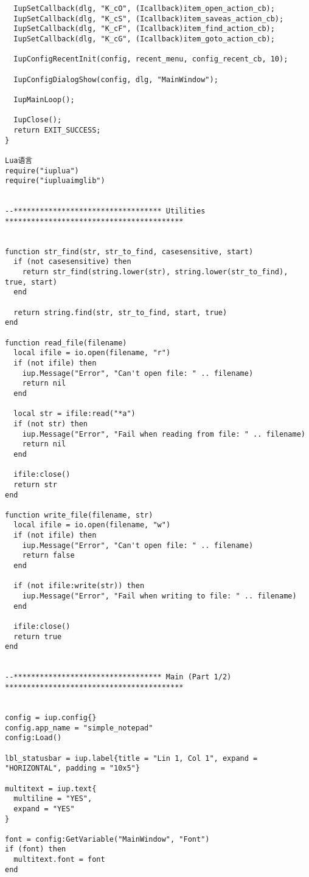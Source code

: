 \documentclass{ctexart}
\begin{document}
\begin{lstlisting}
  IupSetCallback(dlg, "K_cO", (Icallback)item_open_action_cb);
  IupSetCallback(dlg, "K_cS", (Icallback)item_saveas_action_cb);
  IupSetCallback(dlg, "K_cF", (Icallback)item_find_action_cb);
  IupSetCallback(dlg, "K_cG", (Icallback)item_goto_action_cb);

  IupConfigRecentInit(config, recent_menu, config_recent_cb, 10);

  IupConfigDialogShow(config, dlg, "MainWindow");

  IupMainLoop();

  IupClose();
  return EXIT_SUCCESS;
}

Lua语言
require("iuplua")
require("iupluaimglib")


--********************************** Utilities *****************************************


function str_find(str, str_to_find, casesensitive, start)
  if (not casesensitive) then
    return str_find(string.lower(str), string.lower(str_to_find), true, start)
  end

  return string.find(str, str_to_find, start, true)
end

function read_file(filename)
  local ifile = io.open(filename, "r")
  if (not ifile) then
    iup.Message("Error", "Can't open file: " .. filename)
    return nil
  end
  
  local str = ifile:read("*a")
  if (not str) then
    iup.Message("Error", "Fail when reading from file: " .. filename)
    return nil
  end
  
  ifile:close()
  return str
end

function write_file(filename, str)
  local ifile = io.open(filename, "w")
  if (not ifile) then
    iup.Message("Error", "Can't open file: " .. filename)
    return false
  end
  
  if (not ifile:write(str)) then
    iup.Message("Error", "Fail when writing to file: " .. filename)
  end
  
  ifile:close()
  return true
end


--********************************** Main (Part 1/2) *****************************************


config = iup.config{}
config.app_name = "simple_notepad"
config:Load()

lbl_statusbar = iup.label{title = "Lin 1, Col 1", expand = "HORIZONTAL", padding = "10x5"}

multitext = iup.text{
  multiline = "YES",
  expand = "YES"
}

font = config:GetVariable("MainWindow", "Font")
if (font) then
  multitext.font = font
end


\end{lstlisting}
\end{document}
